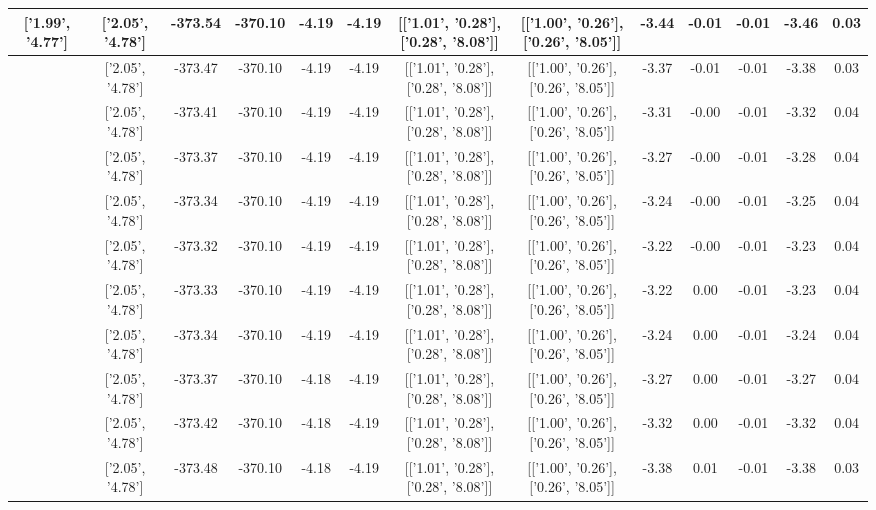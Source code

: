 \begin{table}[htbp]
\begin{adjustbox}{angle=90}
\begin{tabular}{|c|c|c|c|c|c|c|c|c|c|c|c|c|}
 ['1.99', '4.77'] & ['2.05', '4.78'] & -373.54 & -370.10 & -4.19 & -4.19 & [['1.01', '0.28'], ['0.28', '8.08']] & [['1.00', '0.26'], ['0.26', '8.05']] & -3.44 & -0.01 & -0.01 & -3.46 & 0.03\\ \hline
 ['2.00', '4.77'] & ['2.05', '4.78'] & -373.47 & -370.10 & -4.19 & -4.19 & [['1.01', '0.28'], ['0.28', '8.08']] & [['1.00', '0.26'], ['0.26', '8.05']] & -3.37 & -0.01 & -0.01 & -3.38 & 0.03\\ \hline
 ['2.01', '4.77'] & ['2.05', '4.78'] & -373.41 & -370.10 & -4.19 & -4.19 & [['1.01', '0.28'], ['0.28', '8.08']] & [['1.00', '0.26'], ['0.26', '8.05']] & -3.31 & -0.00 & -0.01 & -3.32 & 0.04\\ \hline
 ['2.02', '4.78'] & ['2.05', '4.78'] & -373.37 & -370.10 & -4.19 & -4.19 & [['1.01', '0.28'], ['0.28', '8.08']] & [['1.00', '0.26'], ['0.26', '8.05']] & -3.27 & -0.00 & -0.01 & -3.28 & 0.04\\ \hline
 ['2.04', '4.78'] & ['2.05', '4.78'] & -373.34 & -370.10 & -4.19 & -4.19 & [['1.01', '0.28'], ['0.28', '8.08']] & [['1.00', '0.26'], ['0.26', '8.05']] & -3.24 & -0.00 & -0.01 & -3.25 & 0.04\\ \hline
 ['2.05', '4.78'] & ['2.05', '4.78'] & -373.32 & -370.10 & -4.19 & -4.19 & [['1.01', '0.28'], ['0.28', '8.08']] & [['1.00', '0.26'], ['0.26', '8.05']] & -3.22 & -0.00 & -0.01 & -3.23 & 0.04\\ \hline
 ['2.06', '4.78'] & ['2.05', '4.78'] & -373.33 & -370.10 & -4.19 & -4.19 & [['1.01', '0.28'], ['0.28', '8.08']] & [['1.00', '0.26'], ['0.26', '8.05']] & -3.22 & 0.00 & -0.01 & -3.23 & 0.04\\ \hline
 ['2.07', '4.79'] & ['2.05', '4.78'] & -373.34 & -370.10 & -4.19 & -4.19 & [['1.01', '0.28'], ['0.28', '8.08']] & [['1.00', '0.26'], ['0.26', '8.05']] & -3.24 & 0.00 & -0.01 & -3.24 & 0.04\\ \hline
 ['2.08', '4.79'] & ['2.05', '4.78'] & -373.37 & -370.10 & -4.18 & -4.19 & [['1.01', '0.28'], ['0.28', '8.08']] & [['1.00', '0.26'], ['0.26', '8.05']] & -3.27 & 0.00 & -0.01 & -3.27 & 0.04\\ \hline
 ['2.09', '4.79'] & ['2.05', '4.78'] & -373.42 & -370.10 & -4.18 & -4.19 & [['1.01', '0.28'], ['0.28', '8.08']] & [['1.00', '0.26'], ['0.26', '8.05']] & -3.32 & 0.00 & -0.01 & -3.32 & 0.04\\ \hline
 ['2.10', '4.79'] & ['2.05', '4.78'] & -373.48 & -370.10 & -4.18 & -4.19 & [['1.01', '0.28'], ['0.28', '8.08']] & [['1.00', '0.26'], ['0.26', '8.05']] & -3.38 & 0.01 & -0.01 & -3.38 & 0.03\\ \hline

\end{tabular}
\end{adjustbox}
\end{table}
